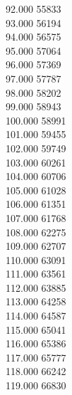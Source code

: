 { 92.000	55833 \\
 93.000	56194 \\
 94.000	56575 \\
 95.000	57064 \\
 96.000	57369 \\
 97.000	57787 \\
 98.000	58202 \\
 99.000	58943 \\
 100.000	58991 \\
 101.000	59455 \\
 102.000	59749 \\
 103.000	60261 \\
 104.000	60706 \\
 105.000	61028 \\
 106.000	61351 \\
 107.000	61768 \\
 108.000	62275 \\
 109.000	62707 \\
 110.000	63091 \\
 111.000	63561 \\
 112.000	63885 \\
 113.000	64258 \\
 114.000	64587 \\
 115.000	65041 \\
 116.000	65386 \\
 117.000	65777 \\
 118.000	66242 \\
 119.000	66830 \\
}
